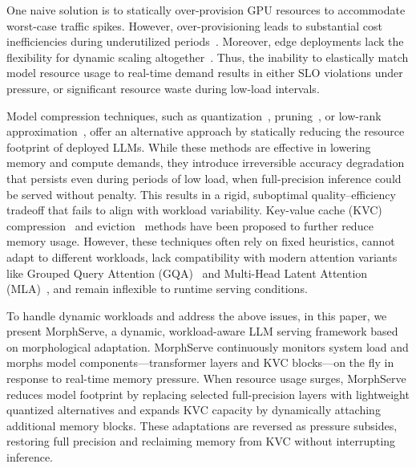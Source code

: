 \documentclass{article}
\newcommand{\system}{{MorphServe}\xspace}
\begin{document}
One naive solution is to statically over-provision GPU resources to accommodate worst-case traffic spikes. 
However, over-provisioning leads to substantial cost inefficiencies during underutilized periods~\cite{jaiswal2025serving_provisioning, fu2024serverlessllm}. Moreover, edge deployments lack the flexibility for dynamic scaling altogether~\cite{cai2024edge_llm}. Thus, the inability to elastically match model resource usage to real-time demand results in either SLO violations under pressure, or significant resource waste during low-load intervals.

Model compression techniques, such as quantization~\cite{lin2024awq, frantar2022gptq, lin2024duquant, shao2023omniquant}, pruning~\cite{ma2023llm_pruning, sreenivas2024llm_pruning, gao2024disp_pruning}, or low-rank approximation~\cite{hu2022lora, wu2024dlora}, offer an alternative approach by statically reducing the resource footprint of deployed LLMs. While these methods are effective in lowering memory and compute demands, they introduce irreversible accuracy degradation that persists even during periods of low load, when full-precision inference could be served without penalty. This results in a rigid, suboptimal quality--efficiency tradeoff that fails to align with workload variability. Key-value cache (KVC) compression~\cite{cai2024pyramidkv, zhou2024dynamickv, li2024snapkv} and eviction~\cite{liu2023scissorhands, feng2024ada} methods have been proposed to further reduce memory usage. However, these techniques often rely on fixed heuristics, cannot adapt to different workloads, lack compatibility with modern attention variants like Grouped Query Attention (GQA)~\cite{ainslie2023gqa, chen2024optimised_gqa, chinnakonduru2024weighted_gqa} and Multi-Head Latent Attention (MLA)~\cite{meng2025transmla, liu2024deepseek}, and remain inflexible to runtime serving conditions.

To handle dynamic workloads and address the above issues, in this paper, we present {\system}, a dynamic, workload-aware LLM serving framework based on morphological adaptation. {\system} continuously monitors system load and morphs model components—transformer layers and KVC blocks—on the fly in response to real-time memory pressure. When resource usage surges, {\system} reduces model footprint by replacing selected full-precision layers with lightweight quantized alternatives and expands KVC capacity by dynamically attaching additional memory blocks. These adaptations are reversed as pressure subsides, restoring full precision and reclaiming memory from KVC without interrupting inference.
\end{document}
